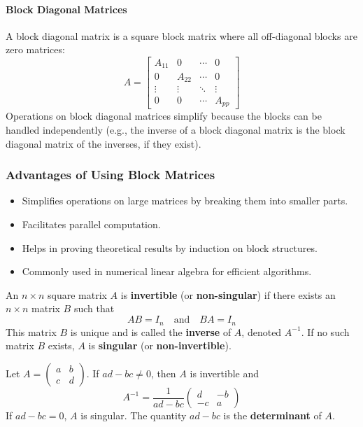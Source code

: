 \documentclass[oneside]{book}
\begin{document}
\paragraph*{Block Diagonal Matrices}
A block diagonal matrix is a square block matrix where all off-diagonal blocks are zero matrices:
\[
A = \begin{bmatrix}
    A_{11} & 0 & \cdots & 0 \\
    0 & A_{22} & \cdots & 0 \\
    \vdots & \vdots & \ddots & \vdots \\
    0 & 0 & \cdots & A_{pp}
\end{bmatrix}
\]
Operations on block diagonal matrices simplify because the blocks can be handled independently (e.g., the inverse of a block diagonal matrix is the block diagonal matrix of the inverses, if they exist).

\subsubsection*{Advantages of Using Block Matrices}
\begin{itemize}
    \item Simplifies operations on large matrices by breaking them into smaller parts.
    \item Facilitates parallel computation.
    \item Helps in proving theoretical results by induction on block structures.
    \item Commonly used in numerical linear algebra for efficient algorithms.
\end{itemize}


\begin{definition}
An $n \times n$ square matrix $A$ is \textbf{invertible} (or \textbf{non-singular}) if there exists an $n \times n$ matrix $B$ such that
\[ AB = I_n \quad \text{and} \quad BA = I_n \]
This matrix $B$ is unique and is called the \textbf{inverse} of $A$, denoted $A^{-1}$.
If no such matrix $B$ exists, $A$ is \textbf{singular} (or \textbf{non-invertible}).
\end{definition}



\begin{example}
Let $A = \begin{pmatrix} a & b \\ c & d \end{pmatrix}$.
If $ad-bc \neq 0$, then $A$ is invertible and
\[ A^{-1} = \frac{1}{ad-bc} \begin{pmatrix} d & -b \\ -c & a \end{pmatrix} \]
If $ad-bc = 0$, $A$ is singular. The quantity $ad-bc$ is the \textbf{determinant} of $A$.
\end{example}
\end{document}
